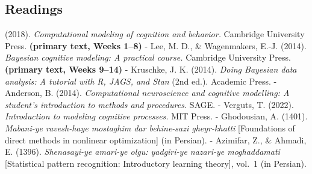 \subsection{Readings}

(2018). \emph{Computational modeling of cognition and behavior.}
Cambridge University Press. \textbf{(primary text, Weeks 1--8)} - Lee,
M. D., \& Wagenmakers, E.-J. (2014). \emph{Bayesian cognitive modeling:
A practical course.} Cambridge University Press. \textbf{(primary text,
Weeks 9--14)} - Kruschke, J. K. (2014). \emph{Doing Bayesian data
analysis: A tutorial with R, JAGS, and Stan} (2nd ed.). Academic Press.
- Anderson, B. (2014). \emph{Computational neuroscience and cognitive
modelling: A student's introduction to methods and procedures.} SAGE. -
Verguts, T. (2022). \emph{Introduction to modeling cognitive processes.}
MIT Press. - Ghodousian, A. (1401). \emph{Mabani-ye ravesh-haye
mostaghim dar behine-sazi gheyr-khatti} {[}Foundations of direct methods
in nonlinear optimization{]} (in Persian). - Azimifar, Z., \& Ahmadi, E.
(1396). \emph{Shenasayi-ye amari-ye olgu: yadgiri-ye nazari-ye
moghaddamati} {[}Statistical pattern recognition: Introductory learning
theory{]}, vol.~1 (in Persian).
